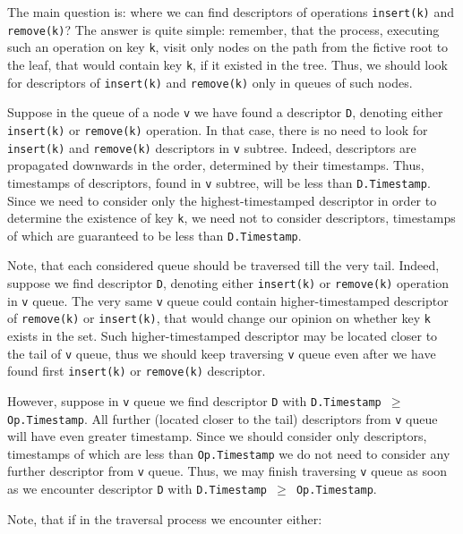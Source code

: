 \documentclass[times, dvipsnames,%
               languages={russian,english} %
              ]{itmo-student-thesis}
\begin{document}
\bigbreak

The main question is: where we can find descriptors of operations \texttt{insert(k)} and \texttt{remove(k)}? The answer is quite simple: remember, that the process, executing such an operation on key \texttt{k}, visit only nodes on the path from the fictive root to the leaf, that would contain key \texttt{k}, if it existed in the tree. Thus, we should look for descriptors of \texttt{insert(k)} and \texttt{remove(k)} only in queues of such nodes.

Suppose in the queue of a node \texttt{v} we have found a descriptor \texttt{D}, denoting either \texttt{insert(k)} or \texttt{remove(k)} operation. In that case, there is no need to look for \texttt{insert(k)} and \texttt{remove(k)} descriptors in \texttt{v} subtree. Indeed, descriptors are propagated downwards in the order, determined by their timestamps. Thus, timestamps of descriptors, found in \texttt{v} subtree, will be less than \texttt{D.Timestamp}. Since we need to consider only the highest-timestamped descriptor in order to determine the existence of key \texttt{k}, we need not to consider descriptors, timestamps of which are guaranteed to be less than \texttt{D.Timestamp}.

Note, that each considered queue should be traversed till the very tail. Indeed, suppose we find descriptor \texttt{D}, denoting either \texttt{insert(k)} or \texttt{remove(k)} operation in \texttt{v} queue. The very same \texttt{v} queue could contain higher-timestamped descriptor of \texttt{remove(k)} or \texttt{insert(k)}, that would change our opinion on whether key \texttt{k} exists in the set. Such higher-timestamped descriptor may be located closer to the tail of \texttt{v} queue, thus we should keep traversing \texttt{v} queue even after we have found first \texttt{insert(k)} or \texttt{remove(k)} descriptor. 

However, suppose in \texttt{v} queue we find descriptor \texttt{D} with \texttt{D.Timestamp $\geq$ Op.Timestamp}. All further (located closer to the tail) descriptors from \texttt{v} queue will have even greater timestamp. Since we should consider only descriptors, timestamps of which are less than \texttt{Op.Timestamp} we do not need to consider any further descriptor from \texttt{v} queue. Thus, we may finish traversing \texttt{v} queue as soon as we encounter descriptor \texttt{D} with \texttt{D.Timestamp $\geq$ Op.Timestamp}.

Note, that if in the traversal process we encounter either:
\end{document}
